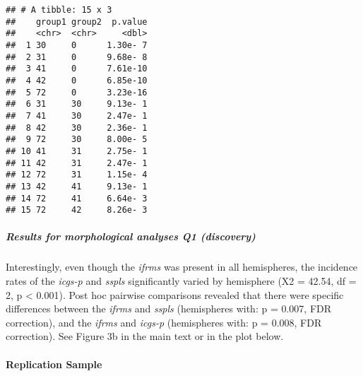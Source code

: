 \documentclass[
]{article}
\newenvironment{Shaded}{\begin{snugshade}}{\end{snugshade}}
\newcommand{\CommentTok}[1]{\textcolor[rgb]{0.56,0.35,0.01}{\textit{#1}}}
\newcommand{\DataTypeTok}[1]{\textcolor[rgb]{0.13,0.29,0.53}{#1}}
\newcommand{\KeywordTok}[1]{\textcolor[rgb]{0.13,0.29,0.53}{\textbf{#1}}}
\newcommand{\NormalTok}[1]{#1}
\newcommand{\OperatorTok}[1]{\textcolor[rgb]{0.81,0.36,0.00}{\textbf{#1}}}
\newcommand{\StringTok}[1]{\textcolor[rgb]{0.31,0.60,0.02}{#1}}
\begin{document}
\begin{Shaded}
\end{Shaded}

\begin{verbatim}
## # A tibble: 15 x 3
##    group1 group2  p.value
##    <chr>  <chr>     <dbl>
##  1 30     0      1.30e- 7
##  2 31     0      9.68e- 8
##  3 41     0      7.61e-10
##  4 42     0      6.85e-10
##  5 72     0      3.23e-16
##  6 31     30     9.13e- 1
##  7 41     30     2.47e- 1
##  8 42     30     2.36e- 1
##  9 72     30     8.00e- 5
## 10 41     31     2.75e- 1
## 11 42     31     2.47e- 1
## 12 72     31     1.15e- 4
## 13 42     41     9.13e- 1
## 14 72     41     6.64e- 3
## 15 72     42     8.26e- 3
\end{verbatim}

\hypertarget{results-for-morphological-analyses-q1-discovery}{%
\subparagraph{Results for morphological analyses Q1
(discovery)}\label{results-for-morphological-analyses-q1-discovery}}

Interestingly, even though the \emph{ifrms} was present in all
hemispheres, the incidence rates of the \emph{icgs-p} and \emph{sspls}
significantly varied by hemisphere (X2 = 42.54, df = 2, p \textless{}
0.001). Post hoc pairwise comparisons revealed that there were specific
differences between the \emph{ifrms} and \emph{sspls} (hemispheres with:
p = 0.007, FDR correction), and the \emph{ifrms} and \emph{icgs-p}
(hemispheres with: p = 0.008, FDR correction). See Figure 3b in the main
text or in the plot below.

\hypertarget{replication-sample}{%
\paragraph{Replication Sample}\label{replication-sample}}

\begin{Shaded}
\end{Shaded}
\end{document}
